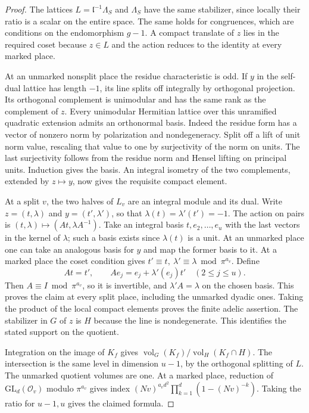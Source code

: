 \documentclass[a4paper,11pt]{article}
\theoremstyle{definition}
\theoremstyle{remark}
\numberwithin{equation}{section}
\begin{document}
\begin{proof}
The lattices \(L=\mathfrak l^{-1}\Lambda_S\) and \(\Lambda_S\)
have the same stabilizer, since locally their ratio is a scalar
on the entire space. The same holds for congruences, which
are conditions on the endomorphism \(g-1\). A compact translate
of \(z\) lies in the required coset because \(z\in L\)
and the action reduces to the identity at every marked place.

At an unmarked nonsplit place the residue characteristic is odd.
If \(y\) in the self-dual lattice has length \(-1\), its line
splits off integrally by orthogonal projection. Its orthogonal
complement is unimodular and has the same rank as the complement
of \(z\). Every unimodular Hermitian lattice over this unramified
quadratic extension admits an orthonormal basis. Indeed the
residue form has a vector of nonzero norm by polarization and
nondegeneracy. Split off a lift of unit norm value, rescaling
that value to one by surjectivity of the norm on units. The
last surjectivity follows from the residue norm and Hensel
lifting on principal units. Induction gives the basis.
An integral isometry of the two complements, extended by
\(z\mapsto y\), now gives the requisite compact element.

At a split \(v\), the two halves of \(L_v\) are an integral
module and its dual. Write \(z=(t,\lambda)\) and
\(y=(t',\lambda')\), so that \(\lambda(t)=\lambda'(t')=-1\).
The action on pairs is
\((t,\lambda)\mapsto(At,\lambda A^{-1})\).
Take an integral basis \(t,e_2,\ldots,e_u\) with the last
vectors in the kernel of \(\lambda\); such a basis exists since
\(\lambda(t)\) is a unit. At an unmarked place one can take
an analogous basis for \(y\) and map the former basis to it.
At a marked place the coset condition gives
\(t'\equiv t,\ \lambda'\equiv\lambda\bmod\pi^{a_v}\).
Define
\[
    At=t',\qquad Ae_j=e_j+\lambda'(e_j)t'\quad (2\le j\le u).
\]
Then \(A\equiv I\bmod\pi^{a_v}\), so it is invertible, and
\(\lambda' A=\lambda\) on the chosen basis. This proves the
claim at every split place, including the unmarked dyadic ones.
Taking the product of the local compact elements proves the
finite adelic assertion. The stabilizer in \(G\) of \(z\) is
\(H\) because the line is nondegenerate. This identifies the
stated support on the quotient.

Integration on the image of \(K_f\) gives
\(\operatorname{vol}_G(K_f)/\operatorname{vol}_H(K_f\cap H)\).
The intersection is the same level in dimension \(u-1\), by
the orthogonal splitting of \(L\). The unmarked quotient
volumes are one. At a marked place, reduction of
\(\mathrm{GL}_d(\mathcal O_v)\) modulo \(\pi^{a_v}\) gives
index \((Nv)^{a_vd^2}\prod_{k=1}^d(1-(Nv)^{-k})\).
Taking the ratio for \(u-1,u\) gives the claimed formula.
\end{proof}
\end{document}
